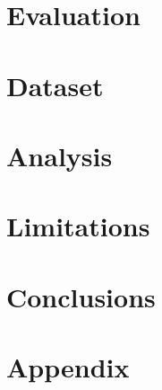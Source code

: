 \section{Evaluation}


\section{Dataset}


\section{Analysis}


\section{Limitations}


\section{Conclusions}

\appendix

\section{Appendix}

\begin{acks}
\end{acks}
